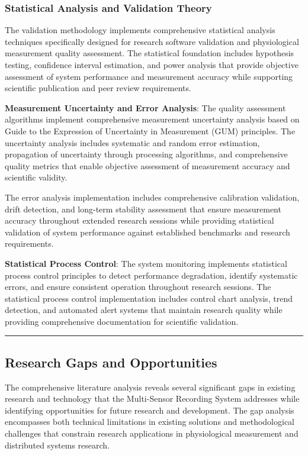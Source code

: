 \documentclass[12pt,a4paper]{report}
\begin{document}
\subsubsection{Statistical Analysis and Validation Theory}

The validation methodology implements comprehensive statistical analysis techniques specifically designed for research
software validation and physiological measurement quality assessment. The statistical foundation includes hypothesis
testing, confidence interval estimation, and power analysis that provide objective assessment of system performance and
measurement accuracy while supporting scientific publication and peer review requirements.

\textbf{Measurement Uncertainty and Error Analysis}: The quality assessment algorithms implement comprehensive measurement
uncertainty analysis based on Guide to the Expression of Uncertainty in Measurement (GUM) principles. The uncertainty
analysis includes systematic and random error estimation, propagation of uncertainty through processing algorithms, and
comprehensive quality metrics that enable objective assessment of measurement accuracy and scientific validity.

The error analysis implementation includes comprehensive calibration validation, drift detection, and long-term
stability assessment that ensure measurement accuracy throughout extended research sessions while providing statistical
validation of system performance against established benchmarks and research requirements.

\textbf{Statistical Process Control}: The system monitoring implements statistical process control principles to detect
performance degradation, identify systematic errors, and ensure consistent operation throughout research sessions. The
statistical process control implementation includes control chart analysis, trend detection, and automated alert systems
that maintain research quality while providing comprehensive documentation for scientific validation.

\hrule

\subsection{Research Gaps and Opportunities}

The comprehensive literature analysis reveals several significant gaps in existing research and technology that the
Multi-Sensor Recording System addresses while identifying opportunities for future research and development. The gap
analysis encompasses both technical limitations in existing solutions and methodological challenges that constrain
research applications in physiological measurement and distributed systems research.
\end{document}
